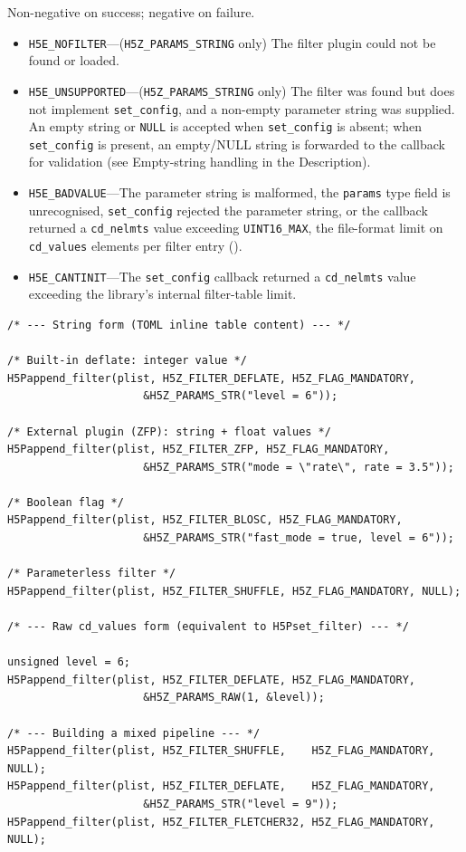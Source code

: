 \documentclass[../RFC-HDFG-2026-001.tex]{subfiles}
\begin{document}
Non-negative on success; negative on failure.


\begin{itemize}
\item \texttt{H5E\_NOFILTER}---(\texttt{H5Z\_PARAMS\_STRING} only) The filter
  plugin could not be found or loaded.
\item \texttt{H5E\_UNSUPPORTED}---(\texttt{H5Z\_PARAMS\_STRING} only) The
  filter was found but does not implement \texttt{set\_config}, and a
  non-empty parameter string was supplied.  An empty string or
  \texttt{NULL} is accepted when \texttt{set\_config} is absent; when
  \texttt{set\_config} is present, an empty/NULL string is forwarded to
  the callback for validation (see Empty-string handling in the
  Description).
\item \texttt{H5E\_BADVALUE}---The parameter string is malformed, the
  \texttt{params} type field is unrecognised, \texttt{set\_config} rejected
  the parameter string, or the callback returned a \texttt{cd\_nelmts}
  value exceeding \texttt{UINT16\_MAX}, the file-format limit on
  \texttt{cd\_values} elements per filter entry
  ().
\item \texttt{H5E\_CANTINIT}---The \texttt{set\_config} callback returned a
  \texttt{cd\_nelmts} value exceeding the library's internal filter-table
  limit.
\end{itemize}


\begin{verbatim}
/* --- String form (TOML inline table content) --- */

/* Built-in deflate: integer value */
H5Pappend_filter(plist, H5Z_FILTER_DEFLATE, H5Z_FLAG_MANDATORY,
                     &H5Z_PARAMS_STR("level = 6"));

/* External plugin (ZFP): string + float values */
H5Pappend_filter(plist, H5Z_FILTER_ZFP, H5Z_FLAG_MANDATORY,
                     &H5Z_PARAMS_STR("mode = \"rate\", rate = 3.5"));

/* Boolean flag */
H5Pappend_filter(plist, H5Z_FILTER_BLOSC, H5Z_FLAG_MANDATORY,
                     &H5Z_PARAMS_STR("fast_mode = true, level = 6"));

/* Parameterless filter */
H5Pappend_filter(plist, H5Z_FILTER_SHUFFLE, H5Z_FLAG_MANDATORY, NULL);

/* --- Raw cd_values form (equivalent to H5Pset_filter) --- */

unsigned level = 6;
H5Pappend_filter(plist, H5Z_FILTER_DEFLATE, H5Z_FLAG_MANDATORY,
                     &H5Z_PARAMS_RAW(1, &level));

/* --- Building a mixed pipeline --- */
H5Pappend_filter(plist, H5Z_FILTER_SHUFFLE,    H5Z_FLAG_MANDATORY, NULL);
H5Pappend_filter(plist, H5Z_FILTER_DEFLATE,    H5Z_FLAG_MANDATORY,
                     &H5Z_PARAMS_STR("level = 9"));
H5Pappend_filter(plist, H5Z_FILTER_FLETCHER32, H5Z_FLAG_MANDATORY, NULL);
\end{verbatim}
\end{document}
